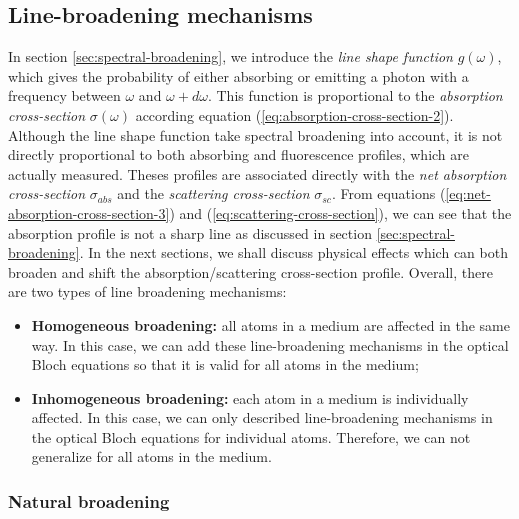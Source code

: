 {%
\subsection{Line-broadening mechanisms}
\label{sec:line-broadening-mechanisms}

In section \ref{sec:spectral-broadening}, we introduce the \textit{line shape function} $ g(\omega) $, which gives the probability of either absorbing or emitting a photon with a frequency between $ \omega $ and $ \omega + d\omega $. This function is proportional to the \textit{absorption cross-section} $ \sigma(\omega) $ according equation (\ref{eq:absorption-cross-section-2}). Although the line shape function take spectral broadening into account, it is not directly proportional to both absorbing and fluorescence profiles, which are actually measured. Theses profiles are associated directly with the \textit{net absorption cross-section} $ \sigma_{abs} $ and the \textit{scattering cross-section} $ \sigma_{sc} $. From equations (\ref{eq:net-absorption-cross-section-3}) and (\ref{eq:scattering-cross-section}), we can see that the absorption profile is not a sharp line as discussed in section \ref{sec:spectral-broadening}. In the next sections, we shall discuss physical effects which can both broaden and shift the absorption/scattering cross-section profile. Overall, there are two types of line broadening mechanisms: 
\begin{itemize}
	\item \textbf{Homogeneous broadening:} all atoms in a medium are affected in the same way. In this case, we can add these line-broadening mechanisms in the optical Bloch equations so that it is valid for all atoms in the medium;

	\item \textbf{Inhomogeneous broadening:} each atom in a medium is individually affected. In this case, we can only described line-broadening mechanisms in the optical Bloch equations for individual atoms. Therefore, we can not generalize for all atoms in the medium.
\end{itemize}

\subsubsection{Natural broadening}
\label{sec:natural-broadening}

}
